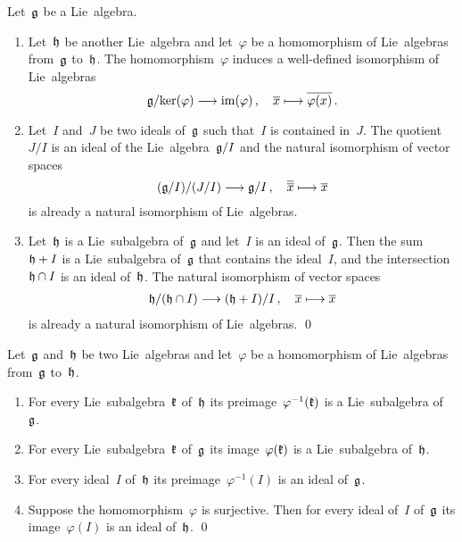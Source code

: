 \begin{corollary}
	\label{isomorphism theorems}
	Let~$\mathfrak{g}$ be a Lie~algebra.
	\begin{enumerate}
		\item
			\label{first isomorphism theorem}
			Let~$\mathfrak{h}$ be another Lie~algebra and let~$\varphi$ be a homomorphism of Lie~algebras from~$\mathfrak{g}$ to~$\mathfrak{h}$.
			The homomorphism~$\varphi$ induces a well-defined isomorphism of Lie~algebras
			\[
				\glie / {\ker(\varphi)}
				\to
				\im(\varphi)  \,,
				\quad
				\class{x}
				\mapsto
				\class{\varphi(x)} \,.
			\]
		\item
			Let~$I$ and~$J$ be two ideals of~$\mathfrak{g}$ such that~$I$ is contained in~$J$.
			The quotient~$J/I$ is an ideal of the Lie~algebra~$\mathfrak{g}/I$ and the natural isomorphism of vector spaces
			\[
				(\glie/I) / (J/I)
				\to
				\glie/I \,,
				\quad
				\class{ \class{x} }
				\mapsto
				\class{x}
			\]
			is already a natural isomorphism of Lie~algebras.
		\item
			Let~$\mathfrak{h}$ is a Lie~subalgebra of~$\mathfrak{g}$ and let~$I$ is an ideal of~$\mathfrak{g}$.
			Then the sum~$\mathfrak{h} + I$ is a Lie~subalgebra of~$\mathfrak{g}$ that contains the ideal~$I$, and the intersection~$\mathfrak{h} \cap I$ is an ideal of~$\mathfrak{h}$.
			The natural isomorphism of vector spaces
			\begin{gather*}
				\hlie/(\hlie \cap I)
				\to
				(\hlie + I)/I \,,
				\quad
				\class{x}
				\mapsto
				\class{x}
			\end{gather*}
			is already a natural isomorphism of Lie~algebras.
		\qed
	\end{enumerate}
\end{corollary}




\begin{proposition}
	Let~$\mathfrak{g}$ and~$\mathfrak{h}$ be two Lie~algebras and let~$\varphi$ be a homomorphism of Lie~algebras from~$\mathfrak{g}$ to~$\mathfrak{h}$.
	\begin{enumerate}
		\item
			For every Lie~subalgebra~$\mathfrak{k}$ of~$\mathfrak{h}$ its preimage~$\varphi^{-1}(\mathfrak{k})$ is a Lie~subalgebra of~$\mathfrak{g}$.
		\item
			For every Lie~subalgebra~$\mathfrak{k}$ of~$\mathfrak{g}$ its image~$\varphi(\mathfrak{k})$ is a Lie~subalgebra of~$\mathfrak{h}$.
		\item
			For every ideal~$I$ of~$\mathfrak{h}$ its preimage~$\varphi^{-1}(I)$ is an ideal of~$\mathfrak{g}$.
		\item
			Suppose the homomorphism~$\varphi$ is surjective.
			Then for every ideal of~$I$ of~$\mathfrak{g}$ its image~$\varphi(I)$ is an ideal of~$\mathfrak{h}$.
		\qed
	\end{enumerate}
\end{proposition}



